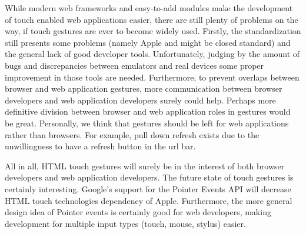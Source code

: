 \documentclass[conference]{IEEEtran}
\begin{document}
While modern web frameworks and easy-to-add modules make the development of touch enabled web applications easier, there are still plenty of problems on the way, if touch gestures are ever to become widely used. Firstly, the standardization still presents some problems (namely Apple and might be closed standard) and the general lack of good developer tools. Unfortunately, judging by the amount of bugs and discrepancies between emulators and real devices some proper improvement in those tools are needed. Furthermore, to prevent overlaps between browser and web application gestures, more communication between browser developers and web application developers surely could help. Perhaps more definitive division between browser and web application roles in gestures would be great. Personally, we think that gestures should be left for web applications rather than browsers. For example, pull down refresh exists due to the unwillingness to have a refresh button in the url bar.  

All in all, HTML touch gestures will surely be in the interest of both browser developers and web application developers. The future state of touch gestures is certainly interesting. Google's support for the Pointer Events API will decrease HTML touch technologies dependency of Apple. Furthermore, the more general design idea of Pointer events is certainly good for web developers, making development for multiple input types (touch, mouse, stylus) easier.




%
\end{document}
